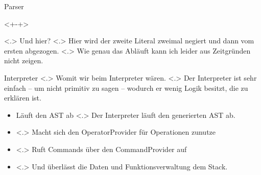 \begin{frame}{Parser}
\begin{itemize}[<+- | alert@+>]
          \begin{uncoverenv}<+-+>%
          \end{uncoverenv}
            \note[item]<.>{
              Und hier?
            }
            \note[item]<.>{
              Hier wird der zweite Literal zweimal negiert und dann vom ersten abgezogen.
            }
            \note[item]<.>{
              Wie genau das Abläuft kann ich leider aus Zeitgründen nicht zeigen.
            }
    \end{itemize}
  \end{frame}

  \begin{frame}{Interpreter}
    \pause
        \note[item]<.>{
          Womit wir beim Interpreter wären.
        }
        \note[item]<.>{
          Der Interpreter ist sehr einfach -- um nicht primitiv zu sagen -- wodurch er wenig Logik besitzt, die zu erklären ist.
        }
    \begin{itemize}[<+- | alert@+>]
      \item Läuft den AST ab
          \note[item]<.>{
            Der Interpreter läuft den generierten AST ab.
          }
      \item {}
          \note[item]<.>{
            Macht sich den OperatorProvider für Operationen zunutze
          }
      \item {}
          \note[item]<.>{
            Ruft Commands über den CommandProvider auf
          }
      \item {}
          \note[item]<.>{
            Und überlässt die Daten und Funktionsverwaltung dem Stack.
          }
    \end{itemize}
  \end{frame}


